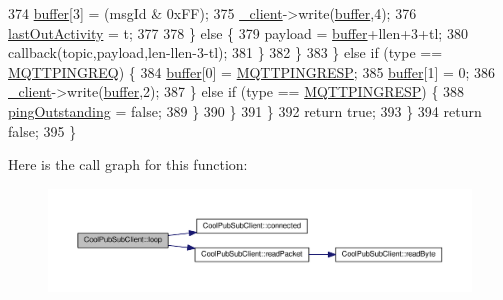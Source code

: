 \begin{DoxyCode}
374                             \hyperlink{class_cool_pub_sub_client_a7e8bcc6096626916046a51bebadc7851}{buffer}[3] = (msgId & 0xFF);
375                             \hyperlink{class_cool_pub_sub_client_a487a65bafb6e3b8e9ab544b13a8878a0}{\_client}->write(\hyperlink{class_cool_pub_sub_client_a7e8bcc6096626916046a51bebadc7851}{buffer},4);
376                             \hyperlink{class_cool_pub_sub_client_a8930f17c8a384f2e7600b5b854d67506}{lastOutActivity} = t;
377 
378                         \} \textcolor{keywordflow}{else} \{
379                             payload = \hyperlink{class_cool_pub_sub_client_a7e8bcc6096626916046a51bebadc7851}{buffer}+llen+3+tl;
380                             callback(topic,payload,len-llen-3-tl);
381                         \}
382                     \}
383                 \} \textcolor{keywordflow}{else} \textcolor{keywordflow}{if} (type == \hyperlink{_cool_pub_sub_client_8h_a41c76538ada72cdb07ec185f01bcd579}{MQTTPINGREQ}) \{
384                     \hyperlink{class_cool_pub_sub_client_a7e8bcc6096626916046a51bebadc7851}{buffer}[0] = \hyperlink{_cool_pub_sub_client_8h_af59e738a766613861161dc5904604c82}{MQTTPINGRESP};
385                     \hyperlink{class_cool_pub_sub_client_a7e8bcc6096626916046a51bebadc7851}{buffer}[1] = 0;
386                     \hyperlink{class_cool_pub_sub_client_a487a65bafb6e3b8e9ab544b13a8878a0}{\_client}->write(\hyperlink{class_cool_pub_sub_client_a7e8bcc6096626916046a51bebadc7851}{buffer},2);
387                 \} \textcolor{keywordflow}{else} \textcolor{keywordflow}{if} (type == \hyperlink{_cool_pub_sub_client_8h_af59e738a766613861161dc5904604c82}{MQTTPINGRESP}) \{
388                     \hyperlink{class_cool_pub_sub_client_a1742f1c17f1a1e2332613f925ad30cf9}{pingOutstanding} = \textcolor{keyword}{false};
389                 \}
390             \}
391         \}
392         \textcolor{keywordflow}{return} \textcolor{keyword}{true};
393     \}
394     \textcolor{keywordflow}{return} \textcolor{keyword}{false};
395 \}
\end{DoxyCode}
Here is the call graph for this function\+:\nopagebreak
\begin{figure}[H]
\begin{center}
\leavevmode
\includegraphics[width=350pt]{d8/d4b/class_cool_pub_sub_client_afc15900f0fc4886a19394508e61793b8_cgraph}
\end{center}
\end{figure}
